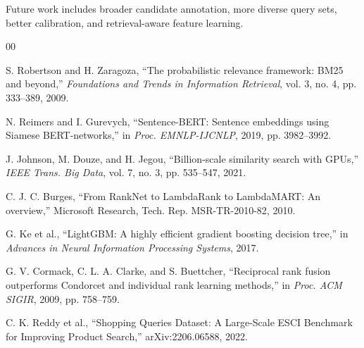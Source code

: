 \documentclass[conference]{IEEEtran}
\begin{document}
Future work includes broader
candidate annotation, more diverse
query sets, better calibration,
and retrieval-aware feature learning.

\begin{thebibliography}{00}

S. Robertson and H. Zaragoza,
``The probabilistic relevance
framework: BM25 and beyond,''
\emph{Foundations and Trends in
Information Retrieval},
vol. 3, no. 4,
pp. 333--389, 2009.

N. Reimers and I. Gurevych,
``Sentence-BERT: Sentence
embeddings using Siamese
BERT-networks,''
in \emph{Proc. EMNLP-IJCNLP},
2019, pp. 3982--3992.

J. Johnson, M. Douze, and H. Jegou,
``Billion-scale similarity
search with GPUs,''
\emph{IEEE Trans. Big Data},
vol. 7, no. 3,
pp. 535--547, 2021.

C. J. C. Burges,
``From RankNet to LambdaRank
to LambdaMART: An overview,''
Microsoft Research,
Tech. Rep. MSR-TR-2010-82, 2010.

G. Ke et al.,
``LightGBM: A highly efficient
gradient boosting decision tree,''
in \emph{Advances in Neural
Information Processing Systems},
2017.

G. V. Cormack, C. L. A. Clarke,
and S. Buettcher,
``Reciprocal rank fusion
outperforms Condorcet and
individual rank learning methods,''
in \emph{Proc. ACM SIGIR},
2009, pp. 758--759.

C. K. Reddy et al.,
``Shopping Queries Dataset:
A Large-Scale ESCI Benchmark
for Improving Product Search,''
arXiv:2206.06588, 2022.

\end{thebibliography}
\end{document}
